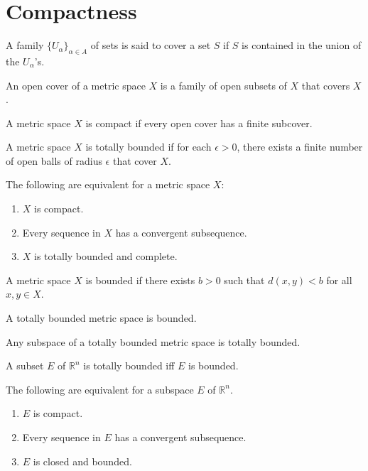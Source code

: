 \documentclass[nobib,notoc]{tufte-handout}
\begin{document}
\section{Compactness}
\begin{defi}[Cover]
	A family \(\{U_{\alpha}\}_{\alpha\in A}\) of sets is said to cover a set \(S\) if \(S\) is contained in the union of the \(U_{\alpha}\)'s.
\end{defi}
\begin{defi}
	An open cover of a metric space \(X\) is a family of open subsets of \(X\) that covers \(X\).
\end{defi}
\begin{defi}[Compactness]
	A metric space \(X\) is compact if every open cover has a finite subcover.
\end{defi}
\begin{defi}
	A metric space \(X\) is totally bounded if for each \(\epsilon>0\), there exists a finite number of open balls of radius \(\epsilon\) that cover \(X\).
\end{defi}
\begin{thm}
	The following are equivalent for a metric space \(X\):
	\begin{enumerate}
		\item \(X\) is compact.
		\item Every sequence in \(X\) has a convergent subsequence.
		\item \(X\) is totally bounded and complete.
	\end{enumerate}
\end{thm}
\begin{defi}[Bounded]
	A metric space \(X\) is bounded if there exists \(b>0\) such that \(d(x,y)<b\) for all \(x,y\in X\).
\end{defi}
\begin{lem}
	A totally bounded metric space is bounded.
\end{lem}
\begin{lem}
	Any subspace of a totally bounded metric space is totally bounded.
\end{lem}
\begin{lem}
	A subset \(E\) of \(\mathbb{R}^n\) is totally bounded iff \(E\) is bounded.
\end{lem}
\begin{thm}
	The following are equivalent for a subspace \(E\) of \(\mathbb{R}^n\).
	\begin{enumerate}
		\item \(E\) is compact.
		\item Every sequence in \(E\) has a convergent subsequence.
		\item \(E\) is closed and bounded.
	\end{enumerate}
\end{thm}
\end{document}
